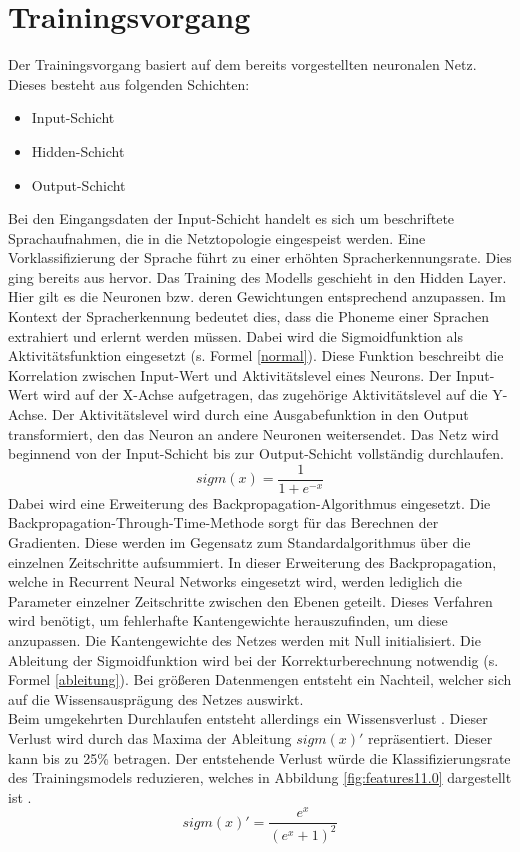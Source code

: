 \section{Trainingsvorgang}

Der Trainingsvorgang basiert auf dem bereits vorgestellten neuronalen Netz. Dieses besteht aus folgenden Schichten:
\begin{itemize}
	\item Input-Schicht
	\item Hidden-Schicht 
	\item Output-Schicht
\end{itemize}
Bei den Eingangsdaten der Input-Schicht handelt es sich um beschriftete Sprachaufnahmen, die in die Netztopologie eingespeist werden. Eine Vorklassifizierung der Sprache führt zu einer erhöhten Spracherkennungsrate. Dies ging bereits aus {\cite{bishop.2006}} hervor. Das Training des Modells geschieht in den Hidden Layer. Hier gilt es die Neuronen bzw. deren Gewichtungen entsprechend anzupassen. Im Kontext der Spracherkennung bedeutet dies, dass die Phoneme einer Sprachen extrahiert und erlernt werden müssen. Dabei wird die Sigmoidfunktion als Aktivitätsfunktion eingesetzt (s. Formel \ref{normal}). Diese Funktion beschreibt die Korrelation zwischen Input-Wert und  Aktivitätslevel eines Neurons. 
Der Input-Wert wird auf der X-Achse aufgetragen, das zugehörige Aktivitätslevel auf die Y-Achse. Der Aktivitätslevel wird durch eine Ausgabefunktion in den Output transformiert, den das Neuron an andere Neuronen weitersendet\cite{Neuronal31:online}. Das Netz wird beginnend von der Input-Schicht bis zur Output-Schicht vollständig durchlaufen.  
\begin{equation}
sigm(x)=\frac{ 1 }{1+e^{-x}  }
\label{normal}
\end{equation}
Dabei wird eine Erweiterung des Backpropagation-Algorithmus eingesetzt. Die Backpropagation-Through-Time-Methode sorgt für das Berechnen der Gradienten. Diese werden im Gegensatz zum Standardalgorithmus über die einzelnen Zeitschritte aufsummiert. In dieser Erweiterung des Backpropagation, welche in Recurrent Neural Networks eingesetzt wird, werden lediglich die Parameter einzelner Zeitschritte zwischen den Ebenen geteilt. Dieses Verfahren wird benötigt, um fehlerhafte Kantengewichte herauszufinden, um diese anzupassen. Die Kantengewichte des Netzes werden mit Null initialisiert. Die Ableitung der Sigmoidfunktion wird bei der Korrekturberechnung notwendig (s. Formel \ref{ableitung}). Bei größeren Datenmengen entsteht ein Nachteil, welcher sich auf die Wissensausprägung des Netzes auswirkt. 
\\
Beim umgekehrten Durchlaufen entsteht allerdings ein Wissensverlust \cite{bishop.2006}. Dieser Verlust wird durch das Maxima der Ableitung $sigm(x)'$ repräsentiert. Dieser kann bis zu 25\% betragen. Der entstehende Verlust würde die Klassifizierungsrate des Trainingsmodels reduzieren, welches in Abbildung \ref{fig:features11.0} dargestellt ist \cite{Kulbear.2017}.
\begin{equation}
sigm(x)'= \frac{ e^{x} }{(e^{x} +1)^2  }
\label{ableitung}
\end{equation}

